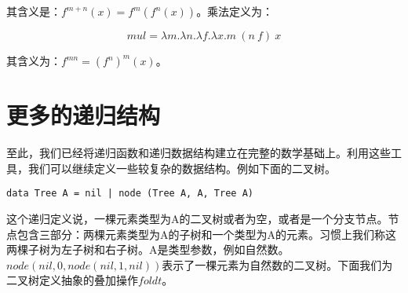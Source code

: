 \documentclass[b5paper]{ctexart}
\begin{document}
\begin{Answer}[ref={ex:lambda-calculus}]
{其含义是：$f^{m + n}(x) = f^m(f^n(x))$。乘法定义为：

\[
mul = \lambda m . \lambda n . \lambda f . \lambda x . m\ (n\ f)\ x
\]

其含义为：$f^{m n} = (f^n)^m(x)$。
}
\end{Answer}

\section{更多的递归结构}

至此，我们已经将递归函数和递归数据结构建立在完整的数学基础上。利用这些工具，我们可以继续定义一些较复杂的数据结构。例如下面的二叉树。

\lstset{frame=none}
\begin{lstlisting}
data Tree A = nil | node (Tree A, A, Tree A)
\end{lstlisting}

这个递归定义说，一棵元素类型为A的二叉树或者为空，或者是一个分支节点。节点包含三部分：两棵元素类型为A的子树和一个类型为A的元素。习惯上我们称这两棵子树为左子树和右子树。A是类型参数，例如自然数。$node(nil, 0, node(nil, 1, nil))$表示了一棵元素为自然数的二叉树。下面我们为二叉树定义抽象的叠加操作$foldt$。
\end{document}
